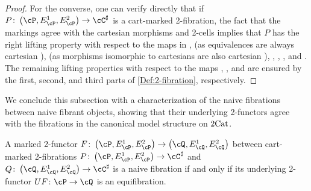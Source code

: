 \documentclass[11pt, dvipsnames]{amsart}
\begin{document}
\begin{proof}
	

			For the converse, one can verify directly that if $P\colon \markedscat{\cP} \to \cC^{\sharp}$ is a cart-marked 2-fibration, the fact that the markings agree with the cartesian morphisms and 2-cells implies that $P$ has the right lifting property with respect to the maps in ,  (as equivalences are always cartesian \cite[Proposition 3.1.11]{Buckley2014}),  (as morphisms isomorphic to cartesians are also cartesian \cite[Proposition 3.1.8]{Buckley2014}), , , , and . The remaining lifting properties with respect to the maps , , and  are ensured by the first, second, and third parts of \cref{Def:2-fibration}, respectively. 
		\end{proof}

	We conclude this subsection with a characterization of the naive fibrations between naive fibrant objects, showing that their underlying 2-functors agree with the fibrations in the canonical model structure on $2\mathrm{Cat}$. 

		\begin{prop}\label{prop:fibbtwfibobj}
			A marked 2-functor $F\colon \markedscat{\cP} \to \markedscat{\cQ}$ between cart-marked 2-fibrations $P\colon\markedscat{\cP}\to \cC^{\sharp}$ and $Q\colon\markedscat{\cQ}\to \cC^{\sharp}$ is a naive fibration if and only if its underlying 2-functor $UF\colon \cP \to \cQ$ is an equifibration.
		\end{prop}
\end{document}
